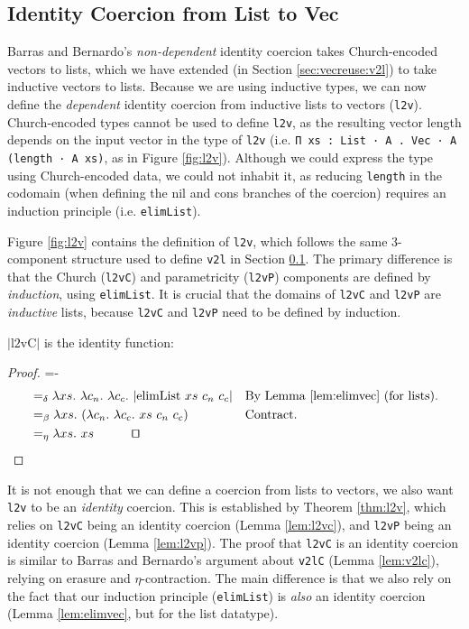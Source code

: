 \documentclass[a4paper,envcountsame,envcountsect]{llncs}
\newcommand{\eqed}[0]{\tag*{\qed}}
\newcommand{\refsec}[1]{Section \ref{sec:#1}}
\newcommand{\labsec}[1]{\label{sec:#1}}
\newcommand{\reffig}[1]{Figure \ref{fig:#1}}
\newcommand{\refthm}[1]{Theorem \ref{thm:#1}}
\newcommand{\reflem}[1]{Lemma \ref{lem:#1}}
\newcommand{\lablem}[1]{\label{lem:#1}}
\newcommand{\earg}[1]{\,\,#1}
\newcommand{\erase}[1]{\ensuremath{\lvert #1 \rvert}}
\newcommand{\fun}[1]{\lambda #1 .~}
\newcommand{\by}[1]{\text{#1}}
\newcommand{\name}[1]{\textrm{#1}}
\begin{document}
\subsection{Identity Coercion from List to Vec}
\labsec{vecreuse:l2v}

Barras and Bernardo's \textit{non-dependent} identity coercion takes
Church-encoded vectors to lists, which we have extended
(in \refsec{vecreuse:v2l}) to take inductive vectors to lists.
Because we are using inductive types, we can now define the
\textit{dependent} identity coercion from inductive lists to vectors
(\texttt{l2v}). Church-encoded types cannot be used to define
\texttt{l2v}, as the resulting vector length depends on the input
vector in the type of \texttt{l2v}
(i.e. \texttt{Π xs : List · A . Vec · A (length · A xs)}, as in
\reffig{l2v}). Although we could express the type using Church-encoded
data, we could not inhabit it, as reducing \texttt{length} in the
codomain (when defining the nil and cons branches of the coercion)
requires an induction principle (i.e. \texttt{elimList}).

\reffig{l2v} contains the definition of \texttt{l2v}, which follows
the same 3-component structure used to define \texttt{v2l} in
\refsec{vecreuse:l2v}. The primary difference is that the
Church (\texttt{l2vC}) and parametricity (\texttt{l2vP}) components
are defined by \textit{induction}, using \texttt{elimList}.
It is crucial that the domains of \texttt{l2vC} and \texttt{l2vP} are
\textit{inductive} lists, because \texttt{l2vC} and \texttt{l2vP} need
to be defined by induction.

\begin{lemma}
\erase{\name{l2vC}} is the identity function:
\lablem{l2vc}
\end{lemma}

\begin{proof}
{\small
\abovedisplayskip=-\baselineskip
\begin{align*}
  &=_\delta \fun{xs} \fun{c_n} \fun{c_c} \erase{
    \name{elimList} \earg xs \earg c_n \earg c_c
  }
  && \by{By \reflem{elimvec} (for lists).}
  \\
  &=_\beta \fun{xs} (\fun{c_n} \fun{c_c}
    xs \earg c_n \earg c_c)
  && \by{Contract.}
  \\
  &=_\eta \fun{xs}{xs}
  \eqed
\end{align*}}
\end{proof}

It is not enough that we can define a coercion from lists to vectors,
we also want \texttt{l2v} to be an \textit{identity} coercion. This is
established by \refthm{l2v}, which relies on \texttt{l2vC} being an
identity coercion (\reflem{l2vc}), and \texttt{l2vP} being an identity
coercion (\reflem{l2vp}).
The proof that \texttt{l2vC} is an identity coercion is similar to
Barras and Bernardo's argument about \texttt{v2lC}
(\reflem{v2lc}), relying on erasure and $\eta$-contraction. The main
difference is that we also rely on the fact that our induction
principle (\texttt{elimList}) is \textit{also} an identity coercion
(\reflem{elimvec}, but for the list datatype).
\end{document}
